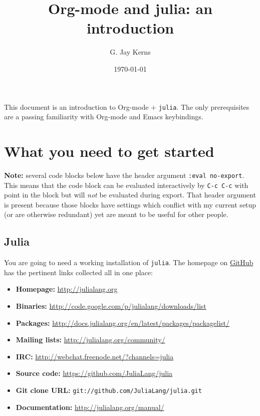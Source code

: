 \documentclass[11pt]{article}
\author{G. Jay Kerns}
\date{\today}
\title{Org-mode and julia: an introduction}
\begin{document}
\maketitle
\tableofcontents

\newpage

This document is an introduction to Org-mode + \texttt{julia}. The only
prerequisites are a passing familiarity with Org-mode and Emacs
keybindings.

\section[What you need to get started]{What you need to get started}
\label{sec-1}

\textbf{Note:} several code blocks below have the header argument \texttt{:eval
  no-export}.  This means that the code block can be evaluated
  interactively by \texttt{C-c C-c} with point in the block but will \emph{not} be
  evaluated during export.  That header argument is present because
  those blocks have settings which conflict with my current setup (or
  are otherwise redundant) yet are meant to be useful for other
  people.

\subsection[Julia]{Julia}
\label{sec-1-1}

You are going to need a working installation of \texttt{julia}.  The homepage
on \href{https://github.com/JuliaLang/julia}{GitHub} has the pertinent links collected all in one place:

\begin{itemize}
\item \textbf{Homepage:} \url{http://julialang.org}
\item \textbf{Binaries:} \url{http://code.google.com/p/julialang/downloads/list}
\item \textbf{Packages:} \url{http://docs.julialang.org/en/latest/packages/packagelist/}
\item \textbf{Mailing lists:} \url{http://julialang.org/community/}
\item \textbf{IRC:} \url{http://webchat.freenode.net/?channels=julia}
\item \textbf{Source code:} \url{https://github.com/JuliaLang/julia}
\item \textbf{Git clone URL:} \texttt{git://github.com/JuliaLang/julia.git}
\item \textbf{Documentation:} \url{http://julialang.org/manual/}
\end{itemize}
\end{document}

